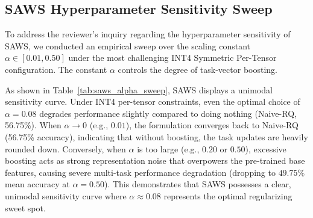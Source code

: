 \documentclass{article}
\theoremstyle{plain}
\theoremstyle{definition}
\theoremstyle{remark}
\begin{document}
\subsection{SAWS Hyperparameter Sensitivity Sweep}
To address the reviewer's inquiry regarding the hyperparameter sensitivity of SAWS, we conducted an empirical sweep over the scaling constant $\alpha \in [0.01, 0.50]$ under the most challenging INT4 Symmetric Per-Tensor configuration. The constant $\alpha$ controls the degree of task-vector boosting. 

\begin{table}[H]
\centering
\caption{Sensitivity analysis of the SAWS scaling constant $\alpha$ under INT4 Symmetric Per-Tensor Quantization.}
\label{tab:saws_alpha_sweep}
\vskip 0.1in
\end{table}

As shown in Table~\ref{tab:saws_alpha_sweep}, SAWS displays a unimodal sensitivity curve. Under INT4 per-tensor constraints, even the optimal choice of $\alpha=0.08$ degrades performance slightly compared to doing nothing (Naive-RQ, 56.75\%). When $\alpha \to 0$ (e.g., $0.01$), the formulation converges back to Naive-RQ (56.75\% accuracy), indicating that without boosting, the task updates are heavily rounded down. Conversely, when $\alpha$ is too large (e.g., $0.20$ or $0.50$), excessive boosting acts as strong representation noise that overpowers the pre-trained base features, causing severe multi-task performance degradation (dropping to $49.75\%$ mean accuracy at $\alpha = 0.50$). This demonstrates that SAWS possesses a clear, unimodal sensitivity curve where $\alpha \approx 0.08$ represents the optimal regularizing sweet spot.
\end{document}
